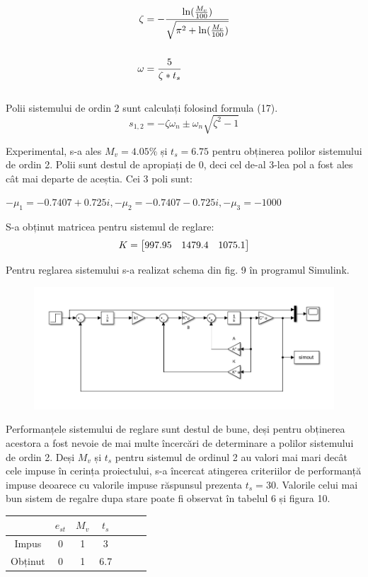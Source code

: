 \documentclass[11pt]{article}
\begin{document}
\begin{align}
\zeta&=-\frac{\ln(\frac{M_v}{100})}{\sqrt{\pi^2+\ln(\frac{M_v}{100})}}\\
\notag\\
\omega&=\frac{5}{\zeta\ast t_s}
\end{align}
\\
Polii sistemului de ordin 2 sunt calculați folosind formula (17).
\begin{equation}
s_{1,2}=-\zeta\omega_{n}\pm\omega_{n}\sqrt{\zeta^2-1}
\end{equation}

Experimental, s-a ales $M_v=4.05\%$ și $t_s=6.75$ pentru obținerea polilor sistemului de ordin 2. Polii sunt destul de apropiați de 0, deci cel de-al 3-lea pol a fost ales cât mai departe de aceștia. Cei 3 poli sunt:
\begin{center}
	$-\mu_1=-0.7407+0.725i,-\mu_2=-0.7407-0.725i,-\mu_3=-1000$
\end{center}
S-a obținut matricea pentru sistemul de reglare:
\begin{align}
K=
\begin{bmatrix}
997.95& 1479.4&1075.1 \notag
\end{bmatrix}
\end{align}

Pentru reglarea sistemului s-a realizat schema din fig. 9 în programul Simulink.
\begin{figure}[H]
	\centering
	\includegraphics[width=1\linewidth]{stare.png}
	\label{fig:test2}
\end{figure}

Performanțele sistemului de reglare sunt destul de bune, deși pentru obținerea acestora a fost nevoie de mai multe încercări de determinare a polilor sistemului de ordin 2. Deși $M_v$ și $t_s$ 
pentru sistemul de ordinul 2 au valori mai mari decât cele impuse în cerința proiectului, s-a încercat atingerea criteriilor de performanță impuse deoarece cu valorile impuse răspunsul prezenta $t_s=30$. Valorile celui mai bun sistem de regalre dupa stare poate fi observat  în tabelul 6 și figura 10.
\begin{center}
	\begin{tabular}{|c|c|c|c|c|c|c|}
		\hline
		&$e_{st}$&$M_v$&$t_s$\\
		\hline
		Impus&0&1&3\\
		\hline
		Obținut&0&1&6.7\\
		\hline
	\end{tabular}
\end{center}
\end{document}
